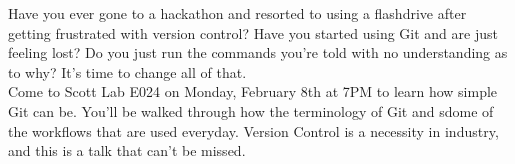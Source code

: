 \documentclass[12pt]{article}
\begin{document}
	\maketitle\noindent
	Have you ever gone to a hackathon and resorted to using a flashdrive after getting frustrated with version control? Have you started using Git and are just feeling lost? Do you just run the commands you're told with no understanding as to why? It's time to change all of that.\\
	\linebreak
	Come to Scott Lab E024 on Monday, February 8th at 7PM to learn how simple Git can be. You'll be walked through how the terminology of Git and sdome of the workflows that are used everyday. Version Control is a necessity in industry, and this is a talk that can't be missed.\\
\end{document}
